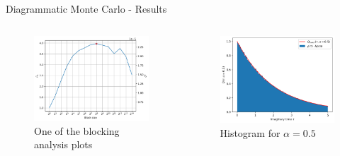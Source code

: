 \documentclass[10pt,xcolor=table, aspectratio=1610]{beamer}
\begin{document}
\begin{frame}[containsverbatim]{Diagrammatic Monte Carlo - Results}
  \begin{columns}
    \begin{figure}
      \centering
      \includegraphics[width=\linewidth]{images/dmc_zero_order_1_i2_blocking.png}
      \caption*{One of the blocking analysis plots}
    \end{figure}
    
    \begin{figure}
      \centering
      \includegraphics[width=\linewidth]{images/dmc_zero_order_05_hist.png}
      \caption*{Histogram for $\alpha=0.5$}
    \end{figure}
  \end{columns}
\end{frame}
\end{document}
